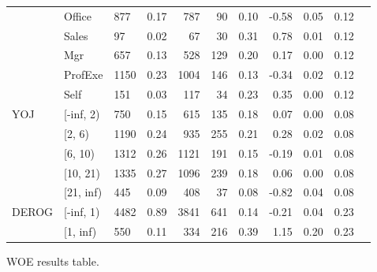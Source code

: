 \begin{landscape}
\begin{figure}[!ht]
\begin{tabular}{lllrrrrrrrr}
			      &   Office &    877 &         0.17 &   787 &   90 &     0.10 & -0.58 &    0.05 &      0.12  \\
			      &    Sales &     97 &         0.02 &    67 &   30 &     0.31 &  0.78 &    0.01 &      0.12 \\
			     &      Mgr &    657 &         0.13 &   528 &  129 &     0.20 &  0.17 &    0.00 &      0.12\\
			       &  ProfExe &   1150 &         0.23 &  1004 &  146 &     0.13 & -0.34 &    0.02 &      0.12  \\
			      &     Self &    151 &         0.03 &   117 &   34 &     0.23 &  0.35 &    0.00 &      0.12  \\
			\midrule
			      YOJ &   [-inf, 2) &    750 &         0.15 &   615 &  135 &     0.18 &  0.07 &    0.00 &      0.08  \\
			      &    [2, 6) &   1190 &         0.24 &   935 &  255 &     0.21 &  0.28 &    0.02 &      0.08  \\
			       &   [6, 10) &   1312 &         0.26 &  1121 &  191 &     0.15 & -0.19 &    0.01 &      0.08 \\
			       &  [10, 21) &   1335 &         0.27 &  1096 &  239 &     0.18 &  0.06 &    0.00 &      0.08  \\
			       &   [21, inf) &    445 &         0.09 &   408 &   37 &     0.08 & -0.82 &    0.04 &      0.08 \\
			\midrule
			    DEROG &  [-inf, 1) &   4482 &         0.89 &  3841 &  641 &     0.14 & -0.21 &    0.04 &      0.23  \\
			     &   [1, inf) &    550 &         0.11 &   334 &  216 &     0.39 &  1.15 &    0.20 &      0.23 \\
			\bottomrule
		\end{tabular}
		\caption{WOE results table. \label{woe_1}}
	\end{figure}
	

\end{landscape}
